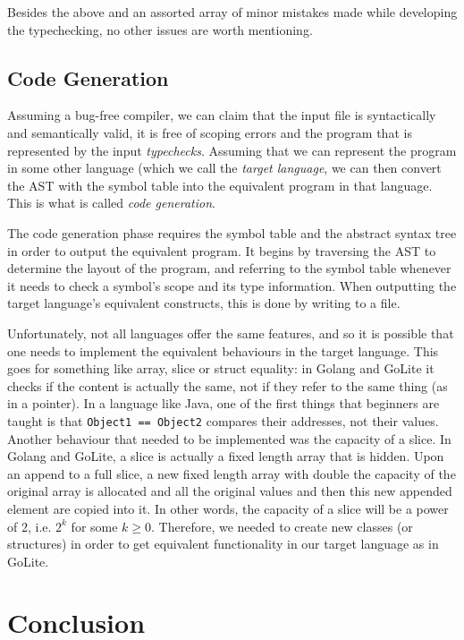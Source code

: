 \documentclass{article}
\begin{document}
Besides the above and an assorted array of minor mistakes made while developing the typechecking, no other issues are worth mentioning.


\subsection{Code Generation}

Assuming a bug-free compiler, we can claim that the input file is syntactically and semantically valid, it is free of scoping errors and the program that is represented by the input \textit{typechecks}. Assuming that we can represent the program in some other language (which we call the \textit{target language}, we can then convert the AST with the symbol table into the equivalent program in that language. This is what is called \textit{code generation}.

The code generation phase requires the symbol table and the abstract syntax tree in order to output the equivalent program. It begins by traversing the AST to determine the layout of the program, and referring to the symbol table whenever it needs to check a symbol's scope and its type information. When outputting the target language's equivalent constructs, this is done by writing to a file. 

Unfortunately, not all languages offer the same features, and so it is possible that one needs to implement the equivalent behaviours in the target language. This goes for something like array, slice or struct equality: in Golang and GoLite it checks if the content is actually the same, not if they refer to the same thing (as in a pointer). In a language like Java, one of the first things that beginners are taught is that \texttt{Object1 == Object2} compares their addresses, not their values. Another behaviour that needed to be implemented was the capacity of a slice. In Golang and GoLite, a slice is actually a fixed length array that is hidden. Upon an append to a full slice, a new fixed length array with double the capacity of the original array is allocated and all the original values and then this new appended element are copied into it. In other words, the capacity of a slice will be a power of 2, i.e. $2^k$ for some $k \geq 0$. Therefore, we needed to create new classes (or structures) in order to get equivalent functionality in our target language as in GoLite.

\section{Conclusion}
\end{document}
